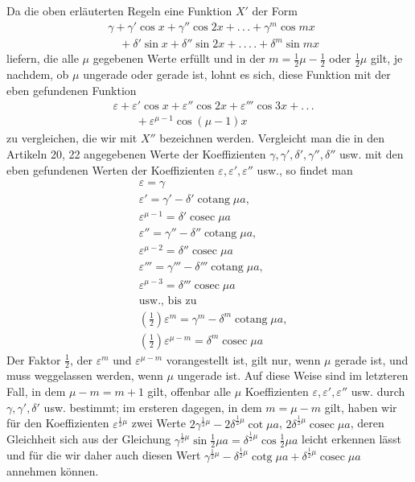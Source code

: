 \begingroup
\renewcommand{\arraystretch}{1.45}
\begingroup
{}
Da die oben erläuterten Regeln eine Funktion $X'$ der Form
\[
\begin{aligned}
&\gamma+\gamma'\cos x+\gamma''\cos2x+.\,.\,.+\gamma^{m}\cos mx\\[5pt]
&\quad+\delta'\sin x+\delta''\sin2x+.\,.\,.\,.+\delta^{m}\sin mx
\end{aligned}
\]
liefern, die alle $\mu$ gegebenen Werte erfüllt und in der $m=\frac12\mu-\frac12$ oder $\frac12\mu$ gilt, je nachdem, ob $\mu$ ungerade oder gerade ist, lohnt es sich, diese Funktion mit der eben gefundenen Funktion
\[
\begin{aligned}
&\varepsilon+\varepsilon'\cos x+\varepsilon''\cos2x+\varepsilon'''\cos3x+.\,.\,.\\[5pt]
&\qquad{}+\varepsilon^{\mu-1}\cos(\mu-1)x
\end{aligned}
\]
\endgroup
{}
zu vergleichen, die wir mit $X''$ bezeichnen werden. Vergleicht man die in den Artikeln 20, 22 angegebenen Werte der Koeffizienten
$\gamma,\gamma',\delta',\gamma'',\delta''$ usw. mit den eben gefundenen Werten der Koeffizienten
$\varepsilon,\varepsilon',\varepsilon''$ usw., so findet man
\[
\begin{aligned}
&\varepsilon=\gamma\\[5pt]
&\varepsilon'=\gamma'-\delta'\operatorname{cotang}\mu a,
\\[5pt]
&\varepsilon^{\mu-1}=\delta'\operatorname{cosec}\mu a\\[5pt]
&\varepsilon''=\gamma''-\delta''\operatorname{cotang}\mu a,
\\[5pt]
&\varepsilon^{\mu-2}=\delta''\operatorname{cosec}\mu a\\[5pt]
&\varepsilon'''=\gamma'''-\delta'''\operatorname{cotang}\mu a,
\\[5pt]
&\varepsilon^{\mu-3}=\delta'''\operatorname{cosec}\mu a\\[5pt]
&\text{usw., bis zu}\\[5pt]
&\left(\tfrac12\right)\varepsilon^m=\gamma^m-\delta^m\operatorname{cotang}\mu a,
\\[5pt]
&\left(\tfrac12\right)\varepsilon^{\mu-m}=\delta^m\operatorname{cosec}\mu a
\end{aligned}
\]
Der Faktor $\tfrac12$, der $\varepsilon^m$ und $\varepsilon^{\mu-m}$ vorangestellt ist, gilt nur, wenn $\mu$ gerade ist, und muss weggelassen werden, wenn $\mu$ ungerade ist. Auf diese Weise sind im letzteren Fall, in dem $\mu-m=m+1$ gilt, offenbar alle $\mu$ Koeffizienten $\varepsilon,\varepsilon',\varepsilon''$ usw. durch $\gamma,\gamma',\delta'$ usw. bestimmt; im ersteren dagegen, in dem $m=\mu-m$ gilt, haben wir für den Koeffizienten $\varepsilon^{\frac12\mu}$ zwei Werte $2\gamma^{\frac12\mu}-2\delta^{\frac12\mu}\cot\mu a$, $2\delta^{\frac12\mu}\operatorname{cosec}\mu a$, deren Gleichheit sich aus der Gleichung $\gamma^{\frac12\mu}\sin\tfrac12\mu a=\delta^{\frac12\mu}\cos\tfrac12\mu a$ leicht erkennen lässt und für die wir daher auch diesen Wert $\gamma^{\frac12\mu}-\delta^{\frac12\mu}\operatorname{cotg}\mu a+\delta^{\frac12\mu}\operatorname{cosec}\mu a$ annehmen können.

